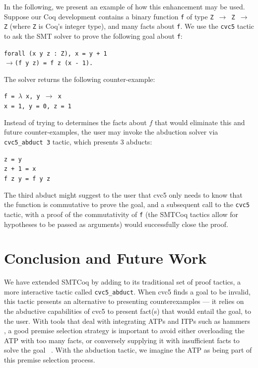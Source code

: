\documentclass[conference]{IEEEtran}
\begin{document}
  In the following, we present an example of how
  this enhancement may be used. Suppose our Coq 
  development 
  contains a binary function \texttt{f} of type 
  \texttt{Z $\to$ Z $\to$ Z} (where \texttt{Z} is
  Coq's integer type), and many facts
  about \texttt{f}. We use the \texttt{cvc5} tactic 
  to ask the SMT solver to prove
  the following goal about \texttt{f}:
  \begin{center}
  	\texttt{forall (x y z : Z), x = y + 1}\\ 
  	\hspace{2cm}$\to$\texttt{(f y z) = f z (x - 1).}
  \end{center}
  The solver returns the following counter-example:
  \begin{center}
  	\texttt{f = $\lambda$ x, y $\to$ x}\\
  	\texttt{x = 1, y = 0, z = 1}
  \end{center}
  Instead of trying to determines the facts about 
  $f$ that would eliminate this and future 
  counter-examples, the user may invoke the 
  abduction solver via \texttt{cvc5\_abduct 3}
  tactic, which presents 3 abducts:
  \begin{center}
  	\texttt{z = y}\\
  	\texttt{z + 1 = x}\\
  	\texttt{f z y = f y z}
  \end{center}
  The third abduct might suggest to the user that 
  cvc5 only needs to know that the function is 
  commutative to prove the goal, and a subsequent 
  call to the \texttt{cvc5} tactic, with a proof
  of the commutativity of \texttt{f} (the SMTCoq 
  tactics allow for hypotheses to be passed 
  as arguments) would successfully close the proof.

\section{Conclusion and Future Work}
  We have extended SMTCoq by adding to its traditional
  set of proof tactics, 
  a more interactive tactic called \texttt{cvc5\_abduct}.
  When cvc5 finds a goal to be invalid, this tactic 
  presents an alternative to presenting counterexamples ---
  it relies on the abductive capabilities of cvc5 
  to present fact(s) that would entail the goal, to the 
  user. With tools that deal with integrating ATPs and
  ITPs such as hammers~\cite{10.1007/978-3-642-22438-6_11}
  \cite{article}, a good premise selection strategy
  is important to avoid either overloading the ATP with
  too many facts, or conversely supplying it with 
  insufficient facts to solve the 
  goal~\cite{DBLP:journals/jar/AlamaHKTU14}
  \cite{10.1007/978-3-642-31365-3_30}. With the 
  abduction tactic, 
  we imagine the ATP as being part of this premise 
  selection process.
  
\end{document}
